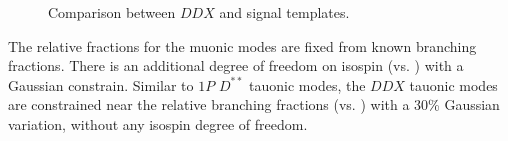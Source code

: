 \begin{figure}[htb]

    \caption{Comparison between $DDX$ and \Dz\taum signal templates.}
    \label{fig:ddx-vs-d0-sig}
\end{figure}


The relative fractions for the muonic modes are fixed from known branching
fractions.
There is an additional degree of freedom on isospin (\Bm vs. \Bzb) with
a Gaussian constrain.
Similar to $1P$ $D^{**}$ tauonic modes,
the $DDX$ tauonic modes are constrained near the relative branching fractions
(\tauon vs. \muon) with a 30\% Gaussian variation,
without any isospin degree of freedom.
